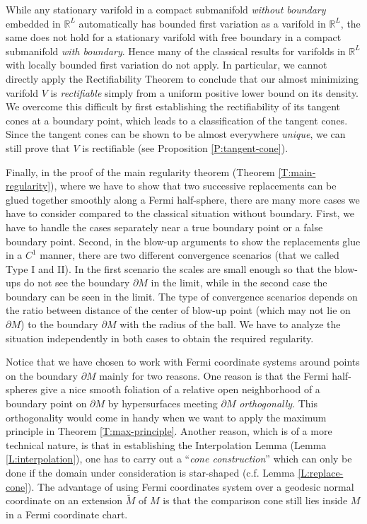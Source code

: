 \documentclass[10pt]{amsart}
\theoremstyle{definition}
\theoremstyle{remark}
\numberwithin{equation}{section}
\newcommand{\ti}{\tilde}
\begin{document}
While any stationary varifold in a compact submanifold \emph{without boundary} embedded in $\mathbb{R}^L$ automatically has bounded first variation as a varifold in $\mathbb{R}^L$, the same does not hold for a stationary varifold with free boundary in a compact submanifold \emph{with boundary}. Hence many of the classical results for varifolds in $\mathbb{R}^L$ with locally bounded first variation do not apply. In particular, we cannot directly apply the Rectifiability Theorem \cite[Theorem 42.4]{Simon} to conclude that our almost minimizing varifold $V$ is \emph{rectifiable} simply from a uniform positive lower bound on its density. We overcome this difficult by first establishing the rectifiability of its tangent cones at a boundary point, which leads to a classification of the tangent cones. Since the tangent cones can be shown to be almost everywhere \emph{unique}, we can still prove that $V$ is rectifiable (see Proposition \ref{P:tangent-cone}).

Finally, in the proof of the main regularity theorem (Theorem \ref{T:main-regularity}), where we have to show that two successive replacements can be glued together smoothly along a Fermi half-sphere, there are many more cases we have to consider compared to the classical situation without boundary. First, we have to handle the cases separately near a true boundary point or a false boundary point. Second, in the blow-up arguments to show the replacements glue in a $C^1$ manner, there are two different convergence scenarios (that we called Type I and II). In the first scenario the scales are small enough so that the blow-ups do not see the boundary $\partial M$ in the limit, while in the second case the boundary can be seen in the limit. The type of convergence scenarios depends on the ratio between distance of the center of blow-up point (which may not lie on $\partial M$) to the boundary $\partial M$ with the radius of the ball. We have to analyze the situation independently in both cases to obtain the required regularity.

Notice that we have chosen to work with Fermi coordinate systems around points on the boundary $\partial M$ mainly for two reasons. One reason is that the Fermi half-spheres give a nice smooth foliation of a relative open neighborhood of a boundary point on $\partial M$ by hypersurfaces meeting $\partial M$ \emph{orthogonally}. This orthogonality would come in handy when we want to apply the maximum principle in Theorem \ref{T:max-principle}. Another reason, which is of a more technical nature, is that in establishing the Interpolation Lemma (Lemma \ref{L:interpolation}), one has to carry out a ``\emph{cone construction}'' which can only be done if the domain under consideration is star-shaped (c.f. Lemma \ref{L:replace-cone}). The advantage of using Fermi coordinates system over a geodesic normal coordinate on an extension $\ti{M}$ of $M$ is that the comparison cone still lies inside $M$ in a Fermi coordinate chart.
\end{document}
